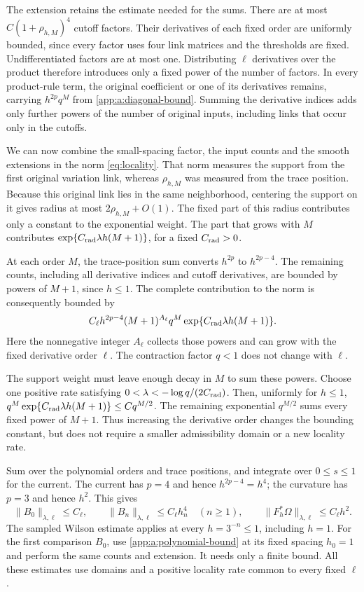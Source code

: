 \documentclass[11pt,a4paper]{article}
\theoremstyle{remark}
\begin{document}
The extension retains the estimate needed for the sums. There are at
most $C(1+\rho_{h,M})^4$ cutoff factors. Their derivatives of each
fixed order are uniformly bounded, since every factor uses four link
matrices and the thresholds are fixed. Undifferentiated factors are at
most one. Distributing $\ell$ derivatives over the product therefore
introduces only a fixed power of the number of factors. In every
product-rule term, the original coefficient or one of its derivatives
remains, carrying $h^{2p}q^M$ from
\eqref{app:a:diagonal-bound}. Summing the derivative indices adds
only further powers of the number of original inputs, including links
that occur only in the cutoffs.

We can now combine the small-spacing factor, the input counts and the
smooth extensions in the norm \eqref{eq:locality}. That norm measures
the support from the first original variation link, whereas
$\rho_{h,M}$ was measured from the trace position. Because this
original link lies in the same neighborhood, centering the support on
it gives radius at most $2\rho_{h,M}+O(1)$. The fixed part of this
radius contributes only a constant to the exponential weight. The part
that grows with $M$ contributes
$\exp\{C_{\rm rad}\lambda h(M+1)\}$, for a fixed
$C_{\rm rad}>0$.

At each order $M$, the trace-position sum converts $h^{2p}$ to
$h^{2p-4}$. The remaining counts, including all derivative indices and
cutoff derivatives, are bounded by powers of $M+1$, since $h\le1$.
The complete contribution to the norm is consequently bounded by
\begin{equation}
 C_\ell h^{2p-4}(M+1)^{A_\ell}q^M
       \exp\{C_{\rm rad}\lambda h(M+1)\}.
 \label{app:a:summed-bound}
\end{equation}
Here the nonnegative integer $A_\ell$ collects those powers and can
grow with the fixed derivative order $\ell$. The contraction factor
$q<1$ does not change with $\ell$.

The support weight must leave enough decay in $M$ to sum these powers.
Choose one positive rate satisfying
$0<\lambda<-\log q/(2C_{\rm rad})$. Then, uniformly for $h\le1$,
$q^M\exp\{C_{\rm rad}\lambda h(M+1)\}\le Cq^{M/2}$.
The remaining exponential $q^{M/2}$ sums every fixed power of $M+1$.
Thus increasing the derivative order changes the bounding constant, but
does not require a smaller admissibility domain or a new locality rate.

Sum over the polynomial orders and trace positions, and integrate over
$0\le s\le1$ for the current. The current has $p=4$ and hence
$h^{2p-4}=h^4$; the curvature has $p=3$ and hence $h^2$. This gives
\begin{equation}
 \|B_0\|_{\lambda,\ell}\le C_\ell,\qquad
 \|B_n\|_{\lambda,\ell}\le C_\ell h_n^4\quad(n\ge1),\qquad
 \|F_h^*\Omega\|_{\lambda,\ell}\le C_\ell h^2.
 \label{app:a:scale-bounds}
\end{equation}
The sampled Wilson estimate applies at every $h=3^{-n}\le1$, including
$h=1$. For the first comparison $B_0$, use
\eqref{app:a:polynomial-bound} at its fixed spacing $h_0=1$ and
perform the same counts and extension. It needs only a finite bound.
All these estimates use domains and a positive locality rate common to
every fixed $\ell$.
\end{document}
